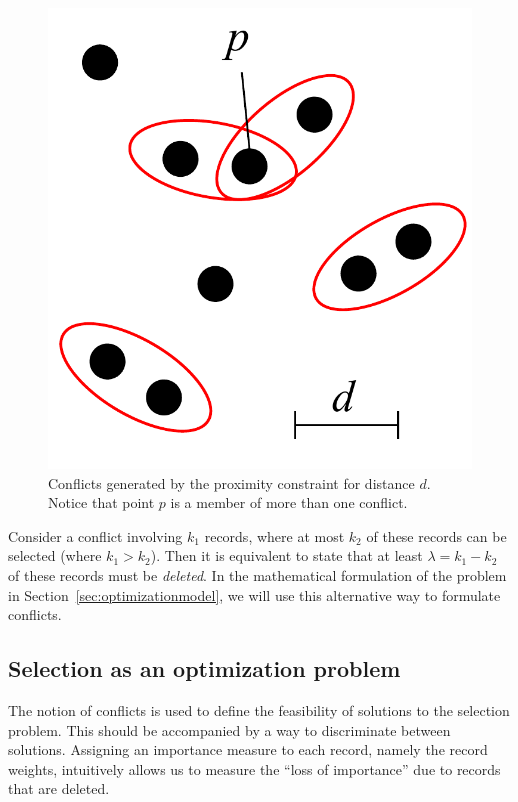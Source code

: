 \documentclass[11pt, oneside]{report}
\begin{document}
{\begin{figure}[htbp]
\begin{center}
\includegraphics[scale=.3]{figs-cvl/cvl_proximity_conflicts.pdf}
\caption{Conflicts generated by the proximity constraint for distance $d$. Notice that point $p$ is a member of more than one conflict.}
\label{fig:cvl:proximity:conflict}
\end{center}
\vspace*{-4ex}
\end{figure}

Consider a conflict involving $k_1$ records, where at most $k_2$ of these records can be selected (where $k_1 > k_2$). Then it is equivalent to state that at least $\lambda = k_1 - k_2$ of these records must be \emph{deleted}. In the mathematical formulation of the problem in Section~\ref{sec:optimizationmodel}, we will use this alternative way to formulate conflicts.

\subsection{Selection as an optimization problem}
\label{sec:cvl:filtering}
The notion of conflicts is used to define the feasibility of solutions to the selection problem. This should be accompanied by a way to discriminate between solutions. Assigning an importance measure to each record, namely the record weights, intuitively allows us to measure the ``loss of importance'' due to records that are deleted.

}
\end{document}
